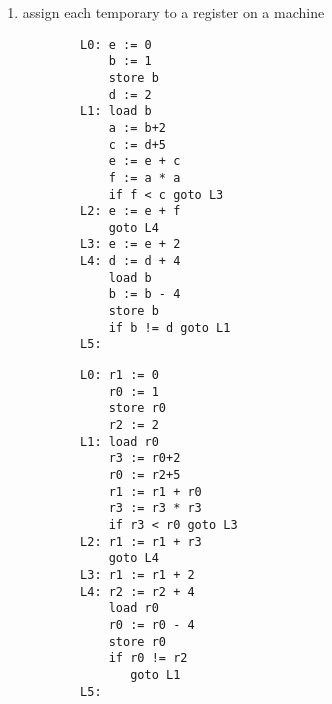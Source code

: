 \documentclass[10pt]{article}
\begin{document}
\begin{enumerate}
\begin{enumerate}
\[\begin{tikzpicture}[shorten >=4pt]
              \end{tikzpicture}
                \]\\\\\\
                \begin{center}\end{center}
                       

    \item assign each temporary to a register on a machine\\
    \begin{verbatim}
        L0: e := 0
            b := 1
            store b
            d := 2
        L1: load b
            a := b+2
            c := d+5
            e := e + c
            f := a * a
            if f < c goto L3
        L2: e := e + f
            goto L4
        L3: e := e + 2
        L4: d := d + 4
            load b
            b := b - 4
            store b
            if b != d goto L1
        L5:
        \end{verbatim}
      
        \begin{verbatim}
        L0: r1 := 0
            r0 := 1
            store r0
            r2 := 2
        L1: load r0
            r3 := r0+2
            r0 := r2+5
            r1 := r1 + r0
            r3 := r3 * r3
            if r3 < r0 goto L3
        L2: r1 := r1 + r3
            goto L4
        L3: r1 := r1 + 2
        L4: r2 := r2 + 4
            load r0
            r0 := r0 - 4
            store r0
            if r0 != r2
               goto L1
        L5:
      

\end{verbatim}
\end{enumerate}
\end{enumerate}
\end{document}
